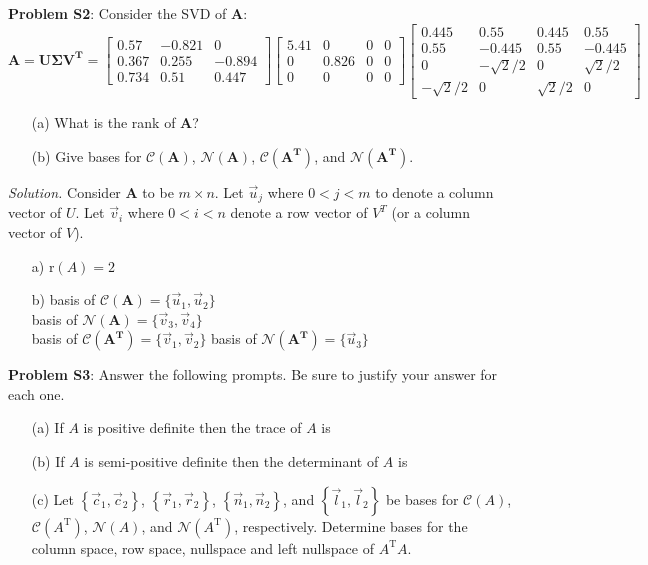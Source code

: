 \documentclass[12pt,pdftex]{article}
\begin{document}
\noindent \textbf{Problem S2}: Consider the SVD of $\mathbf{A}$:\\
$\mathbf{A} = \mathbf{U\Sigma V^T} = \left[\begin{array}{cccc} 0.57 & -0.821 & 
0\\ 0.367 & 0.255 & -0.894 \\ 0.734 & 0.51 & 0.447 
\end{array}\right]\left[\begin{array}{cccc} 5.41 & 0 & 0 & 0\\ 0 & 0.826 &0 & 
0\\0 &0 &0 & 0\end{array}\right]\left[\begin{array}{cccc} 0.445 & 0.55 & 0.445 &
0.55 \\ 0.55 & -0.445 & 0.55 & -0.445 \\ 0 & -\sqrt{2}/2 & 0 & \sqrt{2}/2\\ 
-\sqrt{2}/2 & 0 & \sqrt{2}/2 & 0\end{array}\right]$
\begin{itemize}
\item[(a)] What is the rank of $\mathbf{A}$?
\item[(b)] Give bases for $\mathcal{C}(\mathbf{A})$, $\mathcal{N}(\mathbf{A})$, 
$\mathcal{C}(\mathbf{A^T})$, and $\mathcal{N}(\mathbf{A^T})$.
\end{itemize}

\textit{Solution.}
Consider $\mathbf{A}$ to be $m\times n$. Let $\vec{u}_j$ where $0<j<m$ to denote a column vector of $U$.
Let $\vec{v}_i$ where $0<i<n$ denote a row vector of $V^T$ (or a column vector of $V$).
\begin{itemize}
\item[a)] r$(A)=2$
\item[b)] basis of $\mathcal{C}(\mathbf{A})=\{\vec{u}_1,\vec{u}_2\}$\\
		  basis of $\mathcal{N}(\mathbf{A})=\{\vec{v}_3,\vec{v}_4\}$\\
          basis of $\mathcal{C}(\mathbf{A^T})=\{\vec{v}_1,\vec{v}_2\}$
          basis of $\mathcal{N}(\mathbf{A^T})=\{\vec{u}_3\}$
\end{itemize}

\noindent \textbf{Problem S3}:  Answer the following prompts.  Be sure to 
justify your answer for each one. 
\begin{itemize}
\item[(a)] If $A$ is positive definite then the trace of $A$ is 
\underline{\hspace{50pt}}
\item[(b)] If $A$ is semi-positive definite then the determinant of $A$ is 
\underline{\hspace{50pt}}
\item[(c)] Let $\left\{\vec{c}_1, \vec{c}_2\right\}$, $\left\{\vec{r}_1, 
\vec{r}_2\right\}$, $\left\{\vec{n}_1, \vec{n}_2\right\}$, and $\left
\{\vec{l}_1, \vec{l}_2\right\}$ be bases for $\mathcal{C}(A)$, $\mathcal{C}
(A^\text{T})$, $\mathcal{N}(A)$, and $\mathcal{N}(A^\text{T})$, respectively.  
Determine bases for the column space, row space, nullspace and left nullspace of
$A^\text{T}A$. 
\end{itemize}
\end{document}
